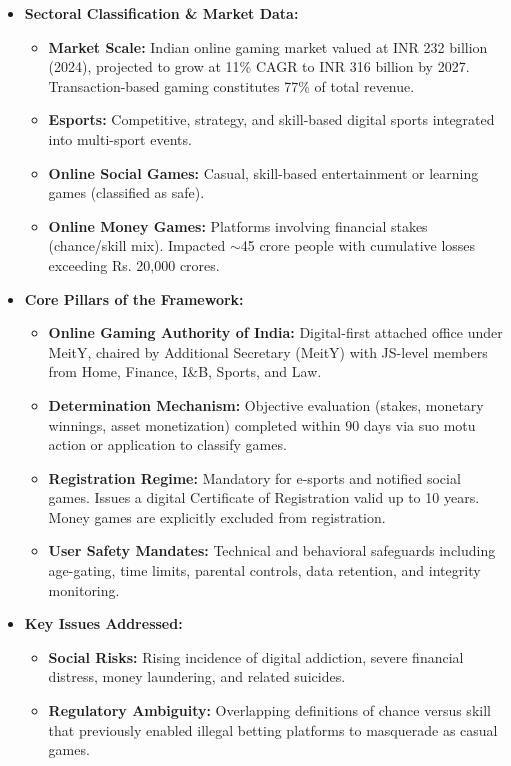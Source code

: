\begin{itemize}
    \item \textbf{Sectoral Classification \& Market Data:}
    \begin{itemize}
        \item \textbf{Market Scale:} Indian online gaming market valued at INR 232 billion (2024), projected to grow at 11\% CAGR to INR 316 billion by 2027. Transaction-based gaming constitutes 77\% of total revenue.
        \item \textbf{Esports:} Competitive, strategy, and skill-based digital sports integrated into multi-sport events.
        \item \textbf{Online Social Games:} Casual, skill-based entertainment or learning games (classified as safe).
        \item \textbf{Online Money Games:} Platforms involving financial stakes (chance/skill mix). Impacted $\sim$45 crore people with cumulative losses exceeding Rs. 20,000 crores.
    \end{itemize}
    \item \textbf{Core Pillars of the Framework:}
    \begin{itemize}
        \item \textbf{Online Gaming Authority of India:} Digital-first attached office under MeitY, chaired by Additional Secretary (MeitY) with JS-level members from Home, Finance, I\&B, Sports, and Law.
        \item \textbf{Determination Mechanism:} Objective evaluation (stakes, monetary winnings, asset monetization) completed within 90 days via suo motu action or application to classify games.
        \item \textbf{Registration Regime:} Mandatory for e-sports and notified social games. Issues a digital Certificate of Registration valid up to 10 years. Money games are explicitly excluded from registration.
        \item \textbf{User Safety Mandates:} Technical and behavioral safeguards including age-gating, time limits, parental controls, data retention, and integrity monitoring.
    \end{itemize}
    \item \textbf{Key Issues Addressed:}
    \begin{itemize}
        \item \textbf{Social Risks:} Rising incidence of digital addiction, severe financial distress, money laundering, and related suicides.
        \item \textbf{Regulatory Ambiguity:} Overlapping definitions of chance versus skill that previously enabled illegal betting platforms to masquerade as casual games.

\end{itemize}
\end{itemize}
